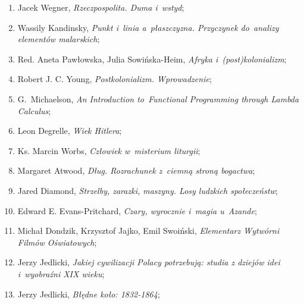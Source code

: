 \documentclass[a4paper,11pt]{article}
\begin{document}
\begin{enumerate}
\item Jacek Wegner, \textit{Rzeczpospolita. Duma i~wstyd};



\item Wassily Kandinsky, \textit{Punkt i~linia a~płaszczyzna. Przyczynek
    do~analizy elementów malarskich};



\item Red. Aneta Pawłowska, Julia Sowińska-Heim, \textit{Afryka
    i~(post)kolonializm};



\item Robert J. C. Young, \textit{Postkolonializm. Wprowadzenie};



\item G.~Michaelson, \textit{An Introduction to~Functional Programming
    through Lambda Calculus};



\item Leon Degrelle, \textit{Wiek Hitlera};



\item Ks. Marcin Worbs, \textit{Człowiek w~misterium liturgii};



\item Margaret Atwood, \textit{Dług. Rozrachunek z~ciemną stroną
    bogactwa};



\item Jared Diamond, \textit{Strzelby, zarazki, maszyny. Losy ludzkich
    społeczeństw};



\item Edward E. Evans-Pritchard, \textit{Czary, wyrocznie i~magia
    u~Azande};



\item Michał Dondzik, Krzysztof Jajko, Emil Swoiński, \textit{Elementarz
    Wytwórni Filmów Oświatowych};



\item Jerzy Jedlicki, \textit{Jakiej cywilizacji Polacy potrzebują:
    studia z dziejów idei i~wyobraźni XIX wieku};



\item Jerzy Jedlicki, \textit{Błędne koło: 1832-1864};




\end{enumerate}
\end{document}
